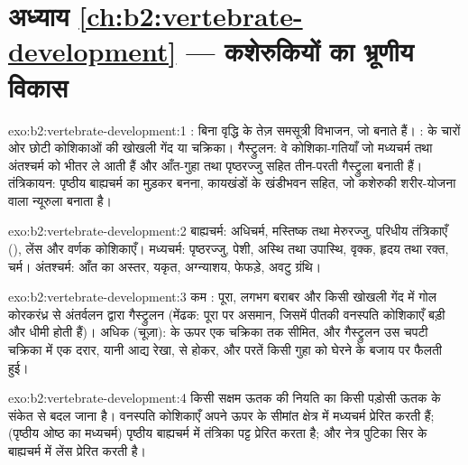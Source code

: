 \section*{अध्याय \ref{ch:b2:vertebrate-development} --- कशेरुकियों का भ्रूणीय विकास}

\begin{solution}{exo:b2:vertebrate-development:1}
: बिना वृद्धि के तेज़ समसूत्री विभाजन, जो  बनाते हैं।
:  के चारों ओर छोटी कोशिकाओं की खोखली गेंद या
चक्रिका। गैस्ट्रुलन: वे कोशिका-गतियाँ जो मध्यचर्म तथा
अंतश्चर्म को भीतर ले आती हैं और आँत-गुहा तथा पृष्ठरज्जु सहित
तीन-परती गैस्ट्रुला बनाती हैं। तंत्रिकायन: पृष्ठीय
बाह्यचर्म का मुड़कर  बनना, कायखंडों के खंडीभवन सहित,
जो कशेरुकी शरीर-योजना वाला न्यूरुला बनाता है।
\end{solution}

\begin{solution}{exo:b2:vertebrate-development:2}
बाह्यचर्म: अधिचर्म, मस्तिष्क तथा मेरुरज्जु, परिधीय तंत्रिकाएँ
(), लेंस और वर्णक कोशिकाएँ। मध्यचर्म: पृष्ठरज्जु, पेशी,
अस्थि तथा उपास्थि, वृक्क, हृदय तथा रक्त, चर्म। अंतश्चर्म:
आँत का अस्तर, यकृत, अग्न्याशय, फेफड़े, अवटु ग्रंथि।
\end{solution}

\begin{solution}{exo:b2:vertebrate-development:3}
कम : पूरा, लगभग बराबर  और किसी खोखली गेंद में
गोल कोरकरंध्र से अंतर्वलन द्वारा गैस्ट्रुलन (मेंढक:
पूरा पर असमान, जिसमें पीतकी वनस्पति कोशिकाएँ बड़ी और धीमी होती हैं)।
अधिक  (चूज़ा):   के ऊपर एक चक्रिका तक सीमित, और
गैस्ट्रुलन उस चपटी चक्रिका में एक दरार, यानी आद्य रेखा, से होकर,
और परतें किसी गुहा को घेरने के बजाय  पर फैलती हुई।
\end{solution}

\begin{solution}{exo:b2:vertebrate-development:4}
 किसी सक्षम ऊतक की नियति का किसी पड़ोसी ऊतक के संकेत से
बदल जाना है। वनस्पति कोशिकाएँ अपने ऊपर के सीमांत क्षेत्र में
मध्यचर्म प्रेरित करती हैं;  (पृष्ठीय ओष्ठ का मध्यचर्म) पृष्ठीय
बाह्यचर्म में तंत्रिका पट्ट प्रेरित करता है; और नेत्र पुटिका
सिर के बाह्यचर्म में लेंस प्रेरित करती है।
\end{solution}

